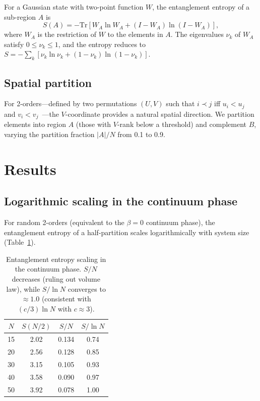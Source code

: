 \documentclass[aps,prd,twocolumn,superscriptaddress,nofootinbib]{revtex4-2}
\begin{document}
For a Gaussian state with two-point function $W$, the entanglement entropy of a sub-region $A$ is~\cite{sorkin2012,saravani2014}
\begin{equation}
S(A) = -\mathrm{Tr}\left[W_A \ln W_A + (I - W_A)\ln(I - W_A)\right],
\end{equation}
where $W_A$ is the restriction of $W$ to the elements in $A$. The eigenvalues $\nu_k$ of $W_A$ satisfy $0 \leq \nu_k \leq 1$, and the entropy reduces to $S = -\sum_k [\nu_k \ln \nu_k + (1-\nu_k)\ln(1-\nu_k)]$.

\subsection{Spatial partition}

For 2-orders---defined by two permutations $(U, V)$ such that $i \prec j$ iff $u_i < u_j$ and $v_i < v_j$~\cite{rideout2000}---the $V$-coordinate provides a natural spatial direction. We partition elements into region $A$ (those with $V$-rank below a threshold) and complement $B$, varying the partition fraction $|A|/N$ from 0.1 to 0.9.

\section{Results}

\subsection{Logarithmic scaling in the continuum phase}

For random 2-orders (equivalent to the $\beta = 0$ continuum phase), the entanglement entropy of a half-partition scales logarithmically with system size (Table~\ref{tab:scaling}).

\begin{table}[h]
\centering
\begin{tabular}{cccc}
\toprule
$N$ & $S(N/2)$ & $S/N$ & $S/\ln N$ \\
\midrule
15 & 2.02 & 0.134 & 0.74 \\
20 & 2.56 & 0.128 & 0.85 \\
30 & 3.15 & 0.105 & 0.93 \\
40 & 3.58 & 0.090 & 0.97 \\
50 & 3.92 & 0.078 & 1.00 \\
\bottomrule
\end{tabular}
\caption{Entanglement entropy scaling in the continuum phase. $S/N$ decreases (ruling out volume law), while $S/\ln N$ converges to $\approx 1.0$ (consistent with $(c/3)\ln N$ with $c \approx 3$).}
\label{tab:scaling}
\end{table}
\end{document}

